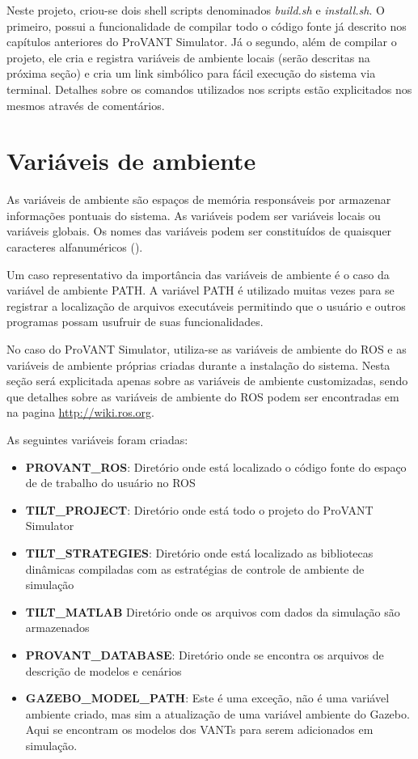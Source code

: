 Neste projeto, criou-se dois shell scripts denominados \textit{build.sh} e \textit{install.sh}. O primeiro, possui a funcionalidade de compilar todo o código fonte já descrito nos capítulos anteriores do ProVANT Simulator. Já o segundo, além de compilar o projeto, ele cria e registra variáveis de ambiente locais (serão descritas na próxima seção) e cria um link simbólico para fácil execução do sistema via terminal. Detalhes sobre os comandos utilizados nos scripts estão explicitados nos mesmos através de comentários.

\section{Variáveis de ambiente}

As variáveis de ambiente são espaços de memória responsáveis por armazenar informações pontuais do sistema. As variáveis podem ser variáveis locais ou variáveis globais. Os nomes das variáveis podem ser constituídos de quaisquer caracteres alfanuméricos (\cite{VE2}). 

Um caso representativo da importância das variáveis de ambiente é o caso da variável de ambiente PATH. A variável PATH é utilizado muitas vezes para se registrar a localização de arquivos executáveis permitindo que o usuário e outros programas possam usufruir de suas funcionalidades.

No caso do ProVANT Simulator, utiliza-se as variáveis de ambiente do ROS e as variáveis de ambiente próprias criadas durante a instalação do sistema. Nesta seção será explicitada apenas sobre as variáveis de ambiente customizadas, sendo que detalhes sobre as variáveis de ambiente do ROS podem ser encontradas em na pagina \url{http://wiki.ros.org}. 

As seguintes variáveis foram criadas:

\begin{itemize}
	\item \textbf{PROVANT\_ROS}: Diretório onde está localizado o código fonte do espaço de de trabalho do usuário no ROS
	\item \textbf{TILT\_PROJECT}: Diretório onde está todo o projeto do ProVANT Simulator 
	\item \textbf{TILT\_STRATEGIES}: Diretório onde está localizado as bibliotecas dinâmicas compiladas com as estratégias de controle de ambiente de simulação
    \item \textbf{TILT\_MATLAB} Diretório onde os arquivos com dados da simulação são
    armazenados
    \item \textbf{PROVANT\_DATABASE}: Diretório onde se encontra os arquivos de descrição de modelos e cenários
    \item \textbf{GAZEBO\_MODEL\_PATH}: Este é uma exceção, não é uma variável ambiente criado, mas sim a atualização de uma variável ambiente do Gazebo. Aqui se encontram os modelos dos VANTs para serem adicionados em simulação.	
\end{itemize}


